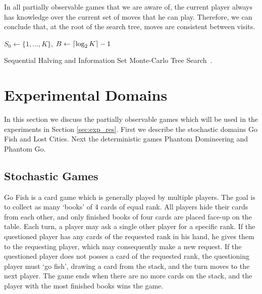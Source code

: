 \documentclass[a4paper]{llncs}
\DeclarePairedDelimiter{\ceil}{\lceil}{\rceil}
\DeclarePairedDelimiter{\floor}{\lfloor}{\rfloor}
\begin{document}
In all partially observable games that we are aware of, the current player always has knowledge over the current set of moves that he can play. Therefore, we can conclude that, at the root of the search tree, moves are consistent between visits.

\IncMargin{1em}
\begin{algorithm2e}[t]
	\vspace{0.05cm}
	$S_0 \gets \{1,\dots,K\}$,
	$B \gets \ceil{\log_2{K}} - 1$														\;
	\BlankLine
  \caption[Sequential Halving]{Sequential Halving and Information Set Monte-Carlo Tree Search~\protect\cite{Karnin13SH,cowling2012}. \label{alg:seqhalv-mcts}}
\end{algorithm2e}
\DecMargin{1em}



\section{Experimental Domains}
\label{sec:exp_dom}

In this section we discuss the partially observable games which will be used in the experiments in Section \ref{sec:exp_res}. First we describe the stochastic domains Go Fish and Lost Cities. Next the deterministic games Phantom Domineering and Phantom Go.

\subsection{Stochastic Games}

{\sc Go Fish} is a card game which is generally played by multiple players. The goal is to collect as many `books' of 4 cards of equal rank. All players hide their cards from each other, and only finished books of four cards are placed face-up on the table. Each turn, a player may ask a single other player for a specific rank. If the questioned player has any cards of the requested rank in his hand, he gives them to the requesting player, which may consequently make a new request. If the questioned player does not posses a card of the requested rank, the questioning player must `go fish', drawing a card from the stack, and the turn moves to the next player. The game ends when there are no more cards on the stack, and the player with the most finished books wins the game.
\end{document}
